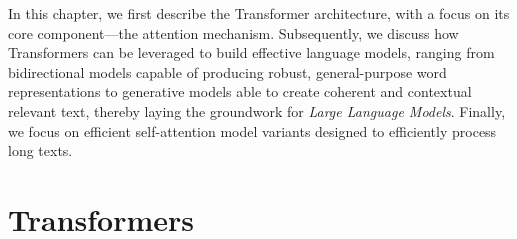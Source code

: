 In this chapter, we first describe the Transformer architecture, with a focus on its core component—the attention mechanism. Subsequently, we discuss how Transformers can be leveraged to build effective language models, ranging from bidirectional models capable of producing robust, general-purpose word representations to generative models able to create coherent and contextual relevant text, thereby laying the groundwork for \textit{Large Language Models}. Finally, we focus on efficient self-attention model variants designed to efficiently process long texts.





\section{Transformers}



